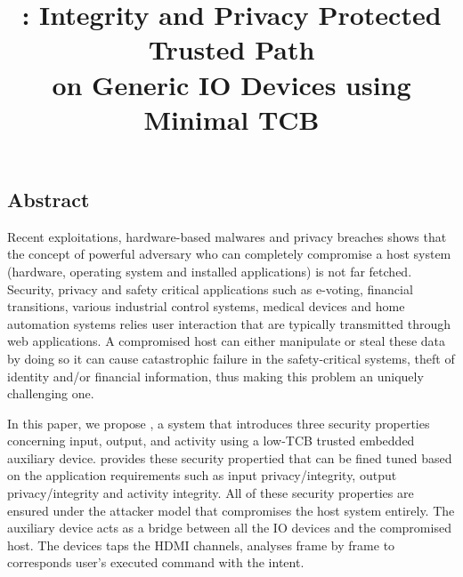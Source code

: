 

\newif\ifpaper
\papertrue


\newif\ifdesperatetime

\graphicspath{{images/}}


\title{\Large \bf \name: Integrity and Privacy Protected Trusted Path \\on Generic IO Devices using Minimal TCB}

\iffalse
\author{\IEEEauthorblockN{Aritra Dhar}
\IEEEauthorblockA{ETH Z{\"u}rich\\
aritra.dhar@inf.ethz.ch}
}
\fi
\maketitle
\subsection*{Abstract}

Recent exploitations, hardware-based malwares and privacy breaches shows that the concept of powerful adversary who can completely compromise a host system (hardware, operating system and installed applications) is not far fetched. Security, privacy and safety critical applications such as e-voting, financial transitions, various industrial control systems, medical devices and home automation systems relies user interaction that are typically transmitted through web applications. A compromised host can either manipulate or steal these data by doing so it can cause catastrophic failure in the safety-critical systems, theft of identity and/or financial information, thus making this problem an uniquely challenging one.

In this paper, we propose \name, a system that introduces three security properties concerning input, output, and activity using a low-TCB trusted embedded auxiliary device. \name provides these security propertied that can be fined tuned based on the application requirements such as input privacy/integrity, output privacy/integrity and activity integrity. All of these security properties are ensured under the attacker model that compromises the host system entirely. The auxiliary device acts as a bridge between all the IO devices and the compromised host. The devices taps the HDMI channels, analyses frame by frame to corresponds user's executed command with the intent. 









{\normalsize  

}


